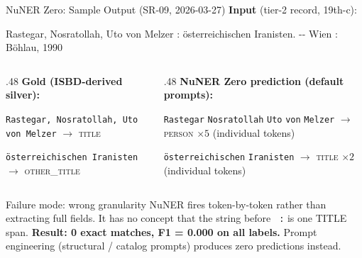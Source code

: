 \documentclass[xcolor,aspectratio=169,compress]{beamer}
\begin{document}
\begin{frame}{NuNER Zero: Sample Output (SR-09, 2026-03-27)}
  \small
  \textbf{Input} (tier-2 record, 19th-c):
  \smallskip
  \begin{center}
  \ttfamily
  Rastegar, Nosratollah, Uto von Melzer : österreichischen Iranisten. -{}- Wien : Böhlau, 1990
  \end{center}
  \smallskip

  \begin{columns}[t]
    \begin{column}{.48\textwidth}
      \textbf{Gold (ISBD-derived silver):}
      \smallskip

      \colorbox{green!25}{\texttt{Rastegar, Nosratollah, Uto von Melzer}}
      $\to$ \textsc{title}

      \smallskip
      \colorbox{blue!20}{\texttt{österreichischen Iranisten}}
      $\to$ \textsc{other\_title}
    \end{column}
    \begin{column}{.48\textwidth}
      \textbf{NuNER Zero prediction (default prompts):}
      \smallskip

      \colorbox{red!20}{\texttt{Rastegar}} \colorbox{red!20}{\texttt{Nosratollah}} \colorbox{red!20}{\texttt{Uto}} \colorbox{red!20}{\texttt{von}} \colorbox{red!20}{\texttt{Melzer}}
      $\to$ \textsc{person} $\times5$ (individual tokens)

      \smallskip
      \colorbox{red!20}{\texttt{österreichischen}} \colorbox{red!20}{\texttt{Iranisten}}
      $\to$ \textsc{title} $\times2$ (individual tokens)
    \end{column}
  \end{columns}
  \smallskip
  \begin{alertblock}{Failure mode: wrong granularity}
    NuNER fires token-by-token rather than extracting full fields.
    It has no concept that the string before \texttt{ :} is one TITLE span.
    \textbf{Result: 0 exact matches, F1 = 0.000 on all labels.}
    Prompt engineering (structural / catalog prompts) produces zero predictions instead.
  \end{alertblock}
\end{frame}
\end{document}
